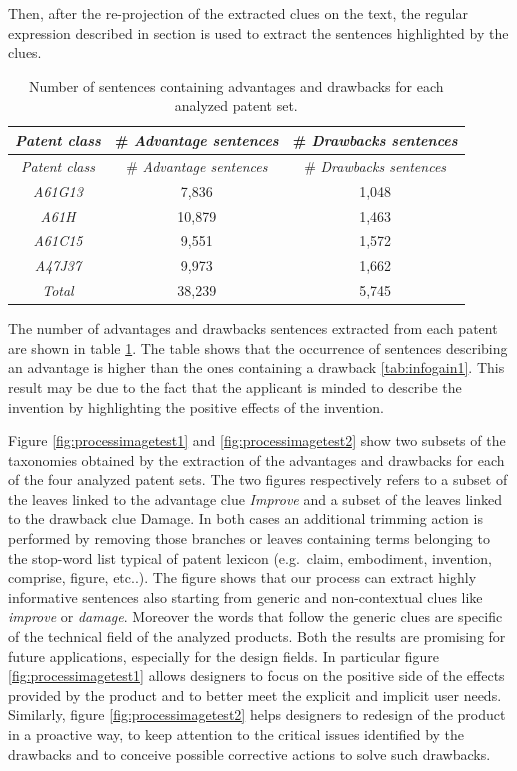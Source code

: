 \documentclass[b5paper,]{book}
\theoremstyle{definition}
\theoremstyle{definition}
\theoremstyle{definition}
\theoremstyle{remark}
\begin{document}
Then, after the re-projection of the extracted clues on the text, the
regular expression described in section is used to extract the sentences
highlighted by the clues.

\begin{longtable}[]{@{}ccc@{}}
\caption{\label{tab:advantagedrawbackssentences} Number of sentences
containing advantages and drawbacks for each analyzed patent
set.}\tabularnewline
\toprule
\emph{Patent class} & \# \emph{Advantage sentences} & \# \emph{Drawbacks
sentences}\tabularnewline
\midrule
\endfirsthead
\toprule
\emph{Patent class} & \# \emph{Advantage sentences} & \# \emph{Drawbacks
sentences}\tabularnewline
\midrule
\endhead
\emph{A61G13} & 7,836 & 1,048\tabularnewline
\emph{A61H} & 10,879 & 1,463\tabularnewline
\emph{A61C15} & 9,551 & 1,572\tabularnewline
\emph{A47J37} & 9,973 & 1,662\tabularnewline
\emph{Total} & 38,239 & 5,745\tabularnewline
\bottomrule
\end{longtable}

The number of advantages and drawbacks sentences extracted from each
patent are shown in table \ref{tab:advantagedrawbackssentences}. The
table shows that the occurrence of sentences describing an advantage is
higher than the ones containing a drawback \ref{tab:infogain1}. This
result may be due to the fact that the applicant is minded to describe
the invention by highlighting the positive effects of the invention.

Figure \ref{fig:processimagetest1} and \ref{fig:processimagetest2} show
two subsets of the taxonomies obtained by the extraction of the
advantages and drawbacks for each of the four analyzed patent sets. The
two figures respectively refers to a subset of the leaves linked to the
advantage clue \emph{Improve} and a subset of the leaves linked to the
drawback clue Damage. In both cases an additional trimming action is
performed by removing those branches or leaves containing terms
belonging to the stop-word list typical of patent lexicon (e.g.~claim,
embodiment, invention, comprise, figure, etc..). The figure shows that
our process can extract highly informative sentences also starting from
generic and non-contextual clues like \emph{improve} or \emph{damage}.
Moreover the words that follow the generic clues are specific of the
technical field of the analyzed products. Both the results are promising
for future applications, especially for the design fields. In particular
figure \ref{fig:processimagetest1} allows designers to focus on the
positive side of the effects provided by the product and to better meet
the explicit and implicit user needs. Similarly, figure
\ref{fig:processimagetest2} helps designers to redesign of the product
in a proactive way, to keep attention to the critical issues identified
by the drawbacks and to conceive possible corrective actions to solve
such drawbacks.
\end{document}
